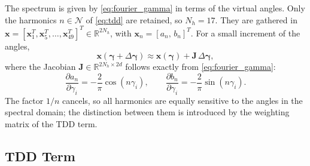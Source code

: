 \documentclass[conference]{IEEEtran}
\newcommand{\gv}{\boldsymbol{\gamma}}
\begin{document}
The spectrum is given by \eqref{eq:fourier_gamma} in terms of the virtual
angles. Only the harmonics $n\in\mathcal{N}$ of \eqref{eq:tdd} are
retained, so $N_h = 17$. They are gathered in
$\mathbf{x} = [\mathbf{x}_1^T,\mathbf{x}_5^T,\dots,\mathbf{x}_{49}^T]^T
\in \mathbb{R}^{2N_h}$, with $\mathbf{x}_n = [a_n,\, b_n]^T$. For a small
increment of the angles,
%
\begin{equation}
  \mathbf{x}(\gv+\Delta\gv) \approx \mathbf{x}(\gv) + \mathbf{J}\,\Delta\gv,
  \label{eq:rt_lin}
\end{equation}
%
where the Jacobian $\mathbf{J}\in\mathbb{R}^{2N_h\times 2d}$ follows
exactly from \eqref{eq:fourier_gamma}:
%
\begin{equation}
  \frac{\partial a_n}{\partial \gamma_i} = -\frac{2}{\pi}\cos(n\gamma_i),
  \qquad
  \frac{\partial b_n}{\partial \gamma_i} = -\frac{2}{\pi}\sin(n\gamma_i).
  \label{eq:rt_jac}
\end{equation}
%
The factor $1/n$ cancels, so all harmonics are equally sensitive to the
angles in the spectral domain; the distinction between them is introduced
by the weighting matrix of the TDD term.

\subsection{TDD Term}
\label{subsec:rt_tdd}
\end{document}
